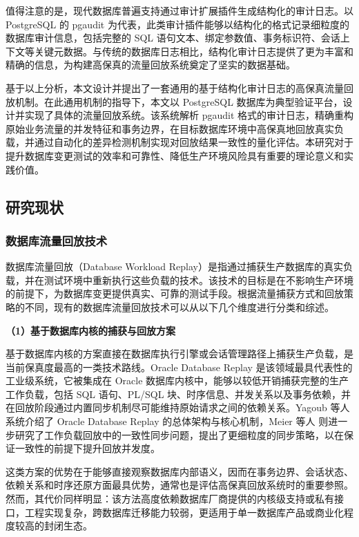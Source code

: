 值得注意的是，现代数据库普遍支持通过审计扩展插件生成结构化的审计日志。以 PostgreSQL 的 pgaudit\cite{pgaudit} 为代表，此类审计插件能够以结构化的格式记录细粒度的数据库审计信息，包括完整的 SQL 语句文本、绑定参数值、事务标识符、会话上下文等关键元数据。与传统的数据库日志相比，结构化审计日志提供了更为丰富和精确的信息，为构建高保真的流量回放系统奠定了坚实的数据基础。

基于以上分析，本文设计并提出了一套通用的基于结构化审计日志的高保真流量回放机制。在此通用机制的指导下，本文以 PostgreSQL 数据库为典型验证平台，设计并实现了具体的流量回放系统。该系统解析 pgaudit 格式的审计日志，精确重构原始业务流量的并发特征和事务边界，在目标数据库环境中高保真地回放真实负载，并通过自动化的差异检测机制实现对回放结果一致性的量化评估。本研究对于提升数据库变更测试的效率和可靠性、降低生产环境风险具有重要的理论意义和实践价值。


\subsection{研究现状}
\subsubsection{数据库流量回放技术}

数据库流量回放（Database Workload Replay）是指通过捕获生产数据库的真实负载，并在测试环境中重新执行这些负载的技术。该技术的目标是在不影响生产环境的前提下，为数据库变更提供真实、可靠的测试手段。根据流量捕获方式和回放策略的不同，现有的数据库流量回放技术可以从以下几个维度进行分类和综述。

\textbf{（1）基于数据库内核的捕获与回放方案}

基于数据库内核的方案直接在数据库执行引擎或会话管理路径上捕获生产负载，是当前保真度最高的一类技术路线。Oracle Database Replay\cite{OracleDatabaseReplay} 是该领域最具代表性的工业级系统，它被集成在 Oracle 数据库内核中，能够以较低开销捕获完整的生产工作负载，包括 SQL 语句、PL/SQL 块、时序信息、并发关系以及事务依赖，并在回放阶段通过内置同步机制尽可能维持原始请求之间的依赖关系。Yagoub 等人\cite{OracleReplayVLDB} 系统介绍了 Oracle Database Replay 的总体架构与核心机制，Meier 等人\cite{ConsistentSync} 则进一步研究了工作负载回放中的一致性同步问题，提出了更细粒度的同步策略，以在保证一致性的前提下提升回放并发度。

这类方案的优势在于能够直接观察数据库内部语义，因而在事务边界、会话状态、依赖关系和时序还原方面最具优势，通常也是评估高保真回放系统时的重要参照。然而，其代价同样明显：该方法高度依赖数据库厂商提供的内核级支持或私有接口，工程实现复杂，跨数据库迁移能力较弱，更适用于单一数据库产品或商业化程度较高的封闭生态。

